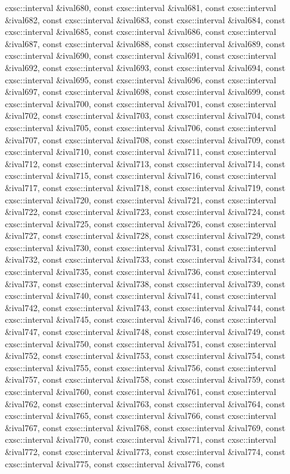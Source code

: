 \begin{DoxyCompactItemize}
cxsc\-::interval \&ival680, const cxsc\-::interval \&ival681, const cxsc\-::interval \&ival682, const cxsc\-::interval \&ival683, const cxsc\-::interval \&ival684, const cxsc\-::interval \&ival685, const cxsc\-::interval \&ival686, const cxsc\-::interval \&ival687, const cxsc\-::interval \&ival688, const cxsc\-::interval \&ival689, const cxsc\-::interval \&ival690, const cxsc\-::interval \&ival691, const cxsc\-::interval \&ival692, const cxsc\-::interval \&ival693, const cxsc\-::interval \&ival694, const cxsc\-::interval \&ival695, const cxsc\-::interval \&ival696, const cxsc\-::interval \&ival697, const cxsc\-::interval \&ival698, const cxsc\-::interval \&ival699, const cxsc\-::interval \&ival700, const cxsc\-::interval \&ival701, const cxsc\-::interval \&ival702, const cxsc\-::interval \&ival703, const cxsc\-::interval \&ival704, const cxsc\-::interval \&ival705, const cxsc\-::interval \&ival706, const cxsc\-::interval \&ival707, const cxsc\-::interval \&ival708, const cxsc\-::interval \&ival709, const cxsc\-::interval \&ival710, const cxsc\-::interval \&ival711, const cxsc\-::interval \&ival712, const cxsc\-::interval \&ival713, const cxsc\-::interval \&ival714, const cxsc\-::interval \&ival715, const cxsc\-::interval \&ival716, const cxsc\-::interval \&ival717, const cxsc\-::interval \&ival718, const cxsc\-::interval \&ival719, const cxsc\-::interval \&ival720, const cxsc\-::interval \&ival721, const cxsc\-::interval \&ival722, const cxsc\-::interval \&ival723, const cxsc\-::interval \&ival724, const cxsc\-::interval \&ival725, const cxsc\-::interval \&ival726, const cxsc\-::interval \&ival727, const cxsc\-::interval \&ival728, const cxsc\-::interval \&ival729, const cxsc\-::interval \&ival730, const cxsc\-::interval \&ival731, const cxsc\-::interval \&ival732, const cxsc\-::interval \&ival733, const cxsc\-::interval \&ival734, const cxsc\-::interval \&ival735, const cxsc\-::interval \&ival736, const cxsc\-::interval \&ival737, const cxsc\-::interval \&ival738, const cxsc\-::interval \&ival739, const cxsc\-::interval \&ival740, const cxsc\-::interval \&ival741, const cxsc\-::interval \&ival742, const cxsc\-::interval \&ival743, const cxsc\-::interval \&ival744, const cxsc\-::interval \&ival745, const cxsc\-::interval \&ival746, const cxsc\-::interval \&ival747, const cxsc\-::interval \&ival748, const cxsc\-::interval \&ival749, const cxsc\-::interval \&ival750, const cxsc\-::interval \&ival751, const cxsc\-::interval \&ival752, const cxsc\-::interval \&ival753, const cxsc\-::interval \&ival754, const cxsc\-::interval \&ival755, const cxsc\-::interval \&ival756, const cxsc\-::interval \&ival757, const cxsc\-::interval \&ival758, const cxsc\-::interval \&ival759, const cxsc\-::interval \&ival760, const cxsc\-::interval \&ival761, const cxsc\-::interval \&ival762, const cxsc\-::interval \&ival763, const cxsc\-::interval \&ival764, const cxsc\-::interval \&ival765, const cxsc\-::interval \&ival766, const cxsc\-::interval \&ival767, const cxsc\-::interval \&ival768, const cxsc\-::interval \&ival769, const cxsc\-::interval \&ival770, const cxsc\-::interval \&ival771, const cxsc\-::interval \&ival772, const cxsc\-::interval \&ival773, const cxsc\-::interval \&ival774, const cxsc\-::interval \&ival775, const cxsc\-::interval \&ival776, const 
\end{DoxyCompactItemize}
